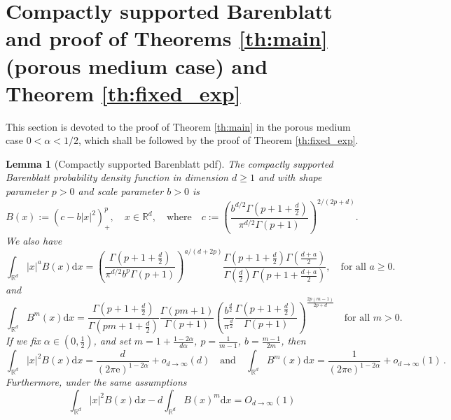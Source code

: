 \documentclass[10pt,reqno]{amsart}
\numberwithin{equation}{section}
\newtheorem{lemma}[theorem]{Lemma}%
\begin{document}
\section{Compactly supported Barenblatt and proof of Theorems \ref{th:main} (porous medium case) and Theorem \ref{th:fixed_exp}}

This section is devoted to the proof of Theorem \ref{th:main} in the porous medium case $0<\alpha<1/2$, which shall be followed by the proof of Theorem \ref{th:fixed_exp}.

\begin{lemma}[Compactly supported Barenblatt pdf]\label{le:Bm>1}
 The compactly supported Barenblatt probability density function in dimension $d\geq1$ and with shape parameter $p>0$ and scale parameter $b>0$ is 
 \begin{equation}\label{eq:CBxc}
   B(x):=(c-b|x|^2)_+^p,\quad x\in\mathbb{R}^d,\quad\text{where}\quad
   c:=\left(\frac{b^{d/2}\Gamma\left(p + 1 + \frac{d}{2}\right)}{\pi^{d/2}\Gamma(p+1)}\right)^{2/(2p+d)}.
 \end{equation}
 We also have 
 \begin{equation} \label{eq:CBac}
   \int_{\mathbb{R}^d}|x|^aB(x)\mathrm{d}x
   =\left(\frac{\Gamma\left(p+1+\frac{d}{2}\right)}{\pi^{d/2}b^p\Gamma(p+1)}\right)^{a/(d+2p)}\frac{\Gamma\left(p+1+\frac{d}{2}\right)\Gamma\left(\frac{d+a}{2}\right)}{\Gamma\left(\frac{d}{2}\right)\Gamma\left(p+1+\frac{d+a}{2}\right)},
   \quad\text{for all $a\geq0$}.
 \end{equation}
 and
 \begin{equation} \label{eq:Bmpme}
     \int_{\mathbb{R}^d}B^m(x)\mathrm{d}x =  \frac{\Gamma(p+1+\frac{d}{2})}{\Gamma(pm+1+\frac{d}{2})} \frac{\Gamma(pm+1)}{\Gamma(p+1)} \left(\frac{b^\frac{d}{2}}{\pi^\frac{d}{2}} \frac{\Gamma(p+1+\frac{d}{2})}{\Gamma(p+1)}\right)^\frac{2p(m-1)}{2p+d}\quad\text{for all $m>0$}.
 \end{equation}
If we fix $\alpha\in\left(0, \frac{1}{2}\right)$, and set $m=1+\frac{1-2\alpha}{d\alpha}$, $p=\frac{1}{m-1}$, $b = \frac{m-1}{2m}$, then
\begin{equation}\label{limit-alpha-constant-pme}
    \int_{\mathbb{R}^d}|x|^2B(x)\mathrm{d}x = \frac{d}{\left(2\pi\mathrm{e}\right)^{1-2\alpha}} + o_{d\to\infty}(d)\quad\mbox{and}\quad \int_{\mathbb{R}^d}B^m(x)\mathrm{d}x = \frac{1}{\left(2\pi\mathrm{e}\right)^{1-2\alpha}}+o_{d\to\infty}(1)\,.
\end{equation}
Furthermore, under the same assumptions
\begin{equation}\label{difference-pme}
    \int_{\mathbb{R}^d}|x|^2 B(x)\mathrm{d}x - d \int_{\mathbb{R}^d}B(x)^m\mathrm{d}x = O_{d\to\infty}(1)
\end{equation}
\end{lemma}
\end{document}
